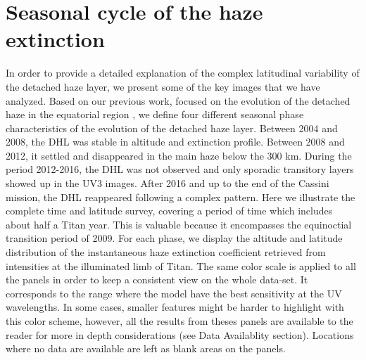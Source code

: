 \section{Seasonal cycle of the haze extinction}

In order to provide a detailed explanation of the complex latitudinal variability of the detached haze layer, we present
some of the key images that we have analyzed. Based on our previous work, focused on the evolution of the detached haze in the
equatorial region \citep{West2018}, we define four different seasonal phase characteristics of the evolution of the detached haze layer.
Between 2004 and 2008, the DHL was stable in altitude and extinction profile.
Between 2008 and 2012, it settled and disappeared in the main haze below the 300 km.
During the period 2012-2016, the DHL was not observed and only sporadic transitory layers showed up in the UV3 images.
After 2016 and up to the end of the Cassini mission, the DHL reappeared following a complex pattern.
Here we illustrate the complete time and latitude survey, covering a period of time which includes about half a Titan year.
This is valuable because it encompasses the equinoctial transition period of 2009.
For each phase, we display the altitude and latitude distribution of the instantaneous haze extinction coefficient retrieved from intensities at the illuminated limb of Titan.
The same color scale is applied to all the panels in order to keep a consistent view on the whole data-set.
It corresponds to the range where the model have the best sensitivity at the UV wavelengths. In some cases, smaller features might be harder to highlight with this color scheme, however, all the results from theses panels are available to the reader for more in depth considerations (see Data Availablity section).
Locations where no data are available are left as blank areas on the panels.





